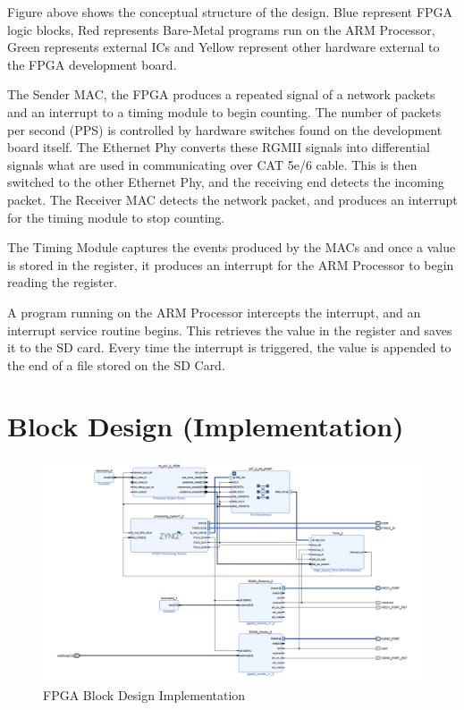 \par Figure above shows the conceptual structure of the design. Blue represent FPGA logic blocks, Red represents 
Bare-Metal programs run on the ARM Processor, Green represents external ICs and Yellow represent other hardware 
external to the FPGA development board.

\par The Sender MAC, the FPGA produces a repeated signal of a network packets and an interrupt to a timing module to 
begin counting. The number of packets per second (PPS) is controlled by hardware switches found on the development 
board itself. The Ethernet Phy converts these RGMII signals into differential signals what are used in communicating 
over CAT 5e/6 cable. This is then switched to the other Ethernet Phy, and the receiving end detects the incoming 
packet. The Receiver MAC detects the network packet, and produces an interrupt for the timing module to stop counting.

\par The Timing Module captures the events produced by the MACs and once a value is stored in the register, it 
produces an interrupt for the ARM Processor to begin reading the register. 

\par A program running on the ARM Processor intercepts the interrupt, and an interrupt service routine begins. This 
retrieves the value in the register and saves it to the SD card. Every time the interrupt is triggered, the value is 
appended to the end of a file stored on the SD Card. 

\section{Block Design (Implementation)}

\begin{figure}[H]
    \begin{center}
        \includegraphics[keepaspectratio,width=15cm]{Images/BlockDesignImpl}
        \caption{FPGA Block Design Implementation}
        \label{fig:blockdesignimpl}
    \end{center}
\end{figure}

